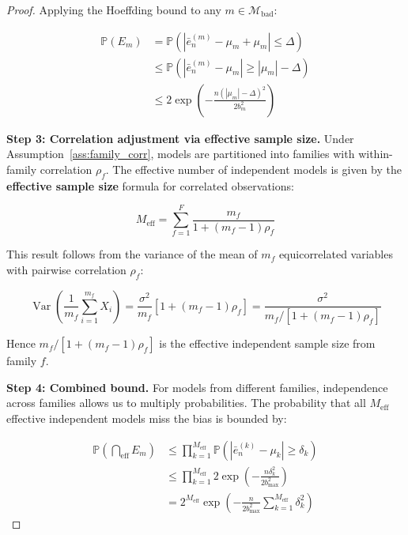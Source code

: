 \documentclass[12pt,a4paper]{article}
\DeclareMathOperator{\Var}{Var}
\begin{document}
\begin{proof}
Applying the Hoeffding bound to any $m \in \mathcal{M}_{\text{bad}}$:

\begin{align}
    \mathbb{P}(E_m) &= \mathbb{P}\left(|\bar{e}_n^{(m)} - \mu_m + \mu_m|
                      \leq \Delta\right) \nonumber \\
                    &\leq \mathbb{P}\left(|\bar{e}_n^{(m)} - \mu_m|
                      \geq |\mu_m| - \Delta\right) \nonumber \\
                    &\leq 2\exp\left(-\frac{n(|\mu_m| - \Delta)^2}
                      {2b_m^2}\right) \label{eq:event_prob}
\end{align}

\medskip\noindent
\textbf{Step 3: Correlation adjustment via effective sample size.}
Under Assumption~\ref{ass:family_corr}, models are partitioned into
families with within-family correlation $\rho_f$.  The effective number
of independent models is given by the \textbf{effective sample size}
formula for correlated observations:

\begin{equation}
    M_{\text{eff}} = \sum_{f=1}^{F} \frac{m_f}{1 + (m_f - 1)\rho_f}
    \label{eq:meff_deriv}
\end{equation}

This result follows from the variance of the mean of $m_f$ equicorrelated
variables with pairwise correlation $\rho_f$:

\begin{equation}
    \Var\left(\frac{1}{m_f} \sum_{i=1}^{m_f} X_i\right)
    = \frac{\sigma^2}{m_f}\left[1 + (m_f - 1)\rho_f\right]
    = \frac{\sigma^2}{m_f / [1 + (m_f - 1)\rho_f]}
    \label{eq:var_corr}
\end{equation}

Hence $m_f / [1 + (m_f - 1)\rho_f]$ is the effective independent sample
size from family $f$.

\medskip\noindent
\textbf{Step 4: Combined bound.}
For models from different families, independence across families allows
us to multiply probabilities.  The probability that all $M_{\text{eff}}$
effective independent models miss the bias is bounded by:

\begin{align}
    \mathbb{P}\left(\bigcap_{\text{eff}} E_m\right)
    &\leq \prod_{k=1}^{M_{\text{eff}}}
       \mathbb{P}\left(|\bar{e}_n^{(k)} - \mu_k| \geq \delta_k\right)
       \nonumber \\
    &\leq \prod_{k=1}^{M_{\text{eff}}}
       2\exp\left(-\frac{n\delta_k^2}{2b_{\max}^2}\right)
       \nonumber \\
    &= 2^{M_{\text{eff}}}
       \exp\left(-\frac{n}{2b_{\max}^2}
       \sum_{k=1}^{M_{\text{eff}}} \delta_k^2\right) \label{eq:step4_interm}
\end{align}


\end{proof}
\end{document}
